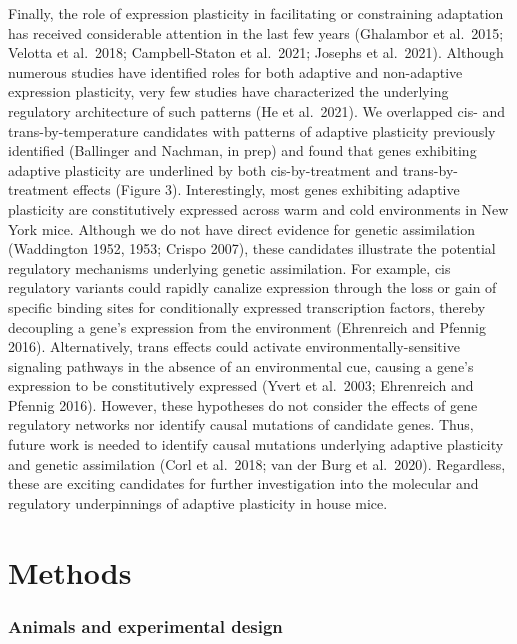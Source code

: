 \documentclass[9pt,twocolumn,twoside,lineno]{pnas-new}
\begin{document}
Finally, the role of expression plasticity in facilitating or
constraining adaptation has received considerable attention in the last
few years (Ghalambor et al.~2015; Velotta et al.~2018; Campbell-Staton
et al.~2021; Josephs et al.~2021). Although numerous studies have
identified roles for both adaptive and non-adaptive expression
plasticity, very few studies have characterized the underlying
regulatory architecture of such patterns (He et al.~2021). We overlapped
cis- and trans-by-temperature candidates with patterns of adaptive
plasticity previously identified (Ballinger and Nachman, in prep) and
found that genes exhibiting adaptive plasticity are underlined by both
cis-by-treatment and trans-by-treatment effects (Figure 3).
Interestingly, most genes exhibiting adaptive plasticity are
constitutively expressed across warm and cold environments in New York
mice. Although we do not have direct evidence for genetic assimilation
(Waddington 1952, 1953; Crispo 2007), these candidates illustrate the
potential regulatory mechanisms underlying genetic assimilation. For
example, cis regulatory variants could rapidly canalize expression
through the loss or gain of specific binding sites for conditionally
expressed transcription factors, thereby decoupling a gene's expression
from the environment (Ehrenreich and Pfennig 2016). Alternatively, trans
effects could activate environmentally-sensitive signaling pathways in
the absence of an environmental cue, causing a gene's expression to be
constitutively expressed (Yvert et al.~2003; Ehrenreich and Pfennig
2016). However, these hypotheses do not consider the effects of gene
regulatory networks nor identify causal mutations of candidate genes.
Thus, future work is needed to identify causal mutations underlying
adaptive plasticity and genetic assimilation (Corl et al.~2018; van der
Burg et al.~2020). Regardless, these are exciting candidates for further
investigation into the molecular and regulatory underpinnings of
adaptive plasticity in house mice.

\hypertarget{methods}{%
\section*{Methods}\label{methods}}

\hypertarget{mice}{%
\subsubsection*{Animals and experimental design}\label{mice}}
\end{document}
